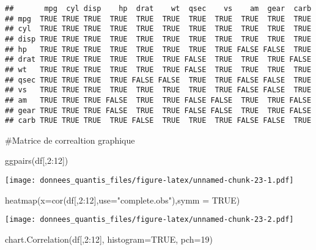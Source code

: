 \documentclass[
]{article}
\newenvironment{Shaded}{\begin{snugshade}}{\end{snugshade}}
\newcommand{\AttributeTok}[1]{\textcolor[rgb]{0.77,0.63,0.00}{#1}}
\newcommand{\ConstantTok}[1]{\textcolor[rgb]{0.00,0.00,0.00}{#1}}
\newcommand{\DecValTok}[1]{\textcolor[rgb]{0.00,0.00,0.81}{#1}}
\newcommand{\FunctionTok}[1]{\textcolor[rgb]{0.00,0.00,0.00}{#1}}
\newcommand{\NormalTok}[1]{#1}
\newcommand{\SpecialCharTok}[1]{\textcolor[rgb]{0.00,0.00,0.00}{#1}}
\newcommand{\StringTok}[1]{\textcolor[rgb]{0.31,0.60,0.02}{#1}}
\begin{document}
\begin{verbatim}
##       mpg  cyl disp    hp  drat    wt  qsec    vs    am  gear  carb
## mpg  TRUE TRUE TRUE  TRUE  TRUE  TRUE  TRUE  TRUE  TRUE  TRUE  TRUE
## cyl  TRUE TRUE TRUE  TRUE  TRUE  TRUE  TRUE  TRUE  TRUE  TRUE  TRUE
## disp TRUE TRUE TRUE  TRUE  TRUE  TRUE  TRUE  TRUE  TRUE  TRUE  TRUE
## hp   TRUE TRUE TRUE  TRUE  TRUE  TRUE  TRUE  TRUE FALSE FALSE  TRUE
## drat TRUE TRUE TRUE  TRUE  TRUE  TRUE FALSE  TRUE  TRUE  TRUE FALSE
## wt   TRUE TRUE TRUE  TRUE  TRUE  TRUE FALSE  TRUE  TRUE  TRUE  TRUE
## qsec TRUE TRUE TRUE  TRUE FALSE FALSE  TRUE  TRUE FALSE FALSE  TRUE
## vs   TRUE TRUE TRUE  TRUE  TRUE  TRUE  TRUE  TRUE FALSE FALSE  TRUE
## am   TRUE TRUE TRUE FALSE  TRUE  TRUE FALSE FALSE  TRUE  TRUE FALSE
## gear TRUE TRUE TRUE FALSE  TRUE  TRUE FALSE FALSE  TRUE  TRUE FALSE
## carb TRUE TRUE TRUE  TRUE FALSE  TRUE  TRUE  TRUE FALSE FALSE  TRUE
\end{verbatim}

\#Matrice de correaltion graphique

\begin{Shaded}
\begin{Highlighting}[]
\FunctionTok{ggpairs}\NormalTok{(df[,}\DecValTok{2}\SpecialCharTok{:}\DecValTok{12}\NormalTok{])}
\end{Highlighting}
\end{Shaded}

\texttt{[image: donnees\_quantis\_files/figure-latex/unnamed-chunk-23-1.pdf]}

\begin{Shaded}
\begin{Highlighting}[]
\FunctionTok{heatmap}\NormalTok{(}\AttributeTok{x=}\FunctionTok{cor}\NormalTok{(df[,}\DecValTok{2}\SpecialCharTok{:}\DecValTok{12}\NormalTok{],}\AttributeTok{use=}\StringTok{"complete.obs"}\NormalTok{),}\AttributeTok{symm =} \ConstantTok{TRUE}\NormalTok{)}
\end{Highlighting}
\end{Shaded}

\texttt{[image: donnees\_quantis\_files/figure-latex/unnamed-chunk-23-2.pdf]}

\begin{Shaded}
\begin{Highlighting}[]
\FunctionTok{chart.Correlation}\NormalTok{(df[,}\DecValTok{2}\SpecialCharTok{:}\DecValTok{12}\NormalTok{], }\AttributeTok{histogram=}\ConstantTok{TRUE}\NormalTok{, }\AttributeTok{pch=}\DecValTok{19}\NormalTok{)}
\end{Highlighting}
\end{Shaded}
\end{document}
